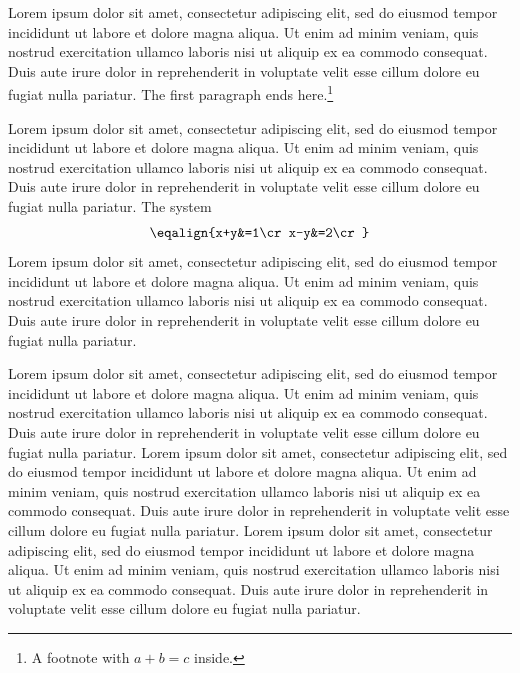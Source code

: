 \hsize=5in \vsize=2.6in 
Lorem ipsum dolor sit amet, consectetur adipiscing elit, sed do eiusmod tempor incididunt
ut labore et dolore magna aliqua. Ut enim ad minim veniam, quis nostrud exercitation
ullamco laboris nisi ut aliquip ex ea commodo consequat. Duis aute irure dolor in
reprehenderit in voluptate velit esse cillum dolore eu fugiat nulla pariatur.
The first paragraph ends here.\footnote*{A footnote with $a+b=c$ inside.}
\par
Lorem ipsum dolor sit amet, consectetur adipiscing elit, sed do eiusmod tempor incididunt
ut labore et dolore magna aliqua. Ut enim ad minim veniam, quis nostrud exercitation
ullamco laboris nisi ut aliquip ex ea commodo consequat. Duis aute irure dolor in
reprehenderit in voluptate velit esse cillum dolore eu fugiat nulla pariatur.
The system $$\eqalign{x+y&=1\cr x-y&=2\cr}$$
Lorem ipsum dolor sit amet, consectetur adipiscing elit, sed do eiusmod tempor incididunt
ut labore et dolore magna aliqua. Ut enim ad minim veniam, quis nostrud exercitation
ullamco laboris nisi ut aliquip ex ea commodo consequat. Duis aute irure dolor in
reprehenderit in voluptate velit esse cillum dolore eu fugiat nulla pariatur.
\par
{}
Lorem ipsum dolor sit amet, consectetur adipiscing elit, sed do eiusmod tempor incididunt
ut labore et dolore magna aliqua. Ut enim ad minim veniam, quis nostrud exercitation
ullamco laboris nisi ut aliquip ex ea commodo consequat. Duis aute irure dolor in
reprehenderit in voluptate velit esse cillum dolore eu fugiat nulla pariatur.
Lorem ipsum dolor sit amet, consectetur adipiscing elit, sed do eiusmod tempor incididunt
ut labore et dolore magna aliqua. Ut enim ad minim veniam, quis nostrud exercitation
ullamco laboris nisi ut aliquip ex ea commodo consequat. Duis aute irure dolor in
reprehenderit in voluptate velit esse cillum dolore eu fugiat nulla pariatur.
\eject
Lorem ipsum dolor sit amet, consectetur adipiscing elit, sed do eiusmod tempor incididunt
ut labore et dolore magna aliqua. Ut enim ad minim veniam, quis nostrud exercitation
ullamco laboris nisi ut aliquip ex ea commodo consequat. Duis aute irure dolor in
reprehenderit in voluptate velit esse cillum dolore eu fugiat nulla pariatur.
\bye
